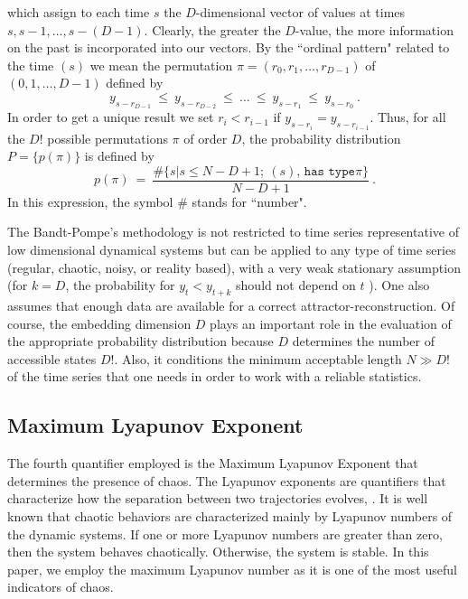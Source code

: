 which assign to each time $s$ the $D$-dimensional vector of values
at times $s, s-1,\dots,s-(D-1)$. Clearly, the greater the
$D$-value, the more information on the past  is incorporated into
our vectors. By the ``ordinal pattern" related to the time $(s)$
we mean the permutation $\pi=(r_0,r_1, \dots,r_{D-1})$ of
$(0,1,\dots,D-1)$ defined by
\begin{equation}
y_{s-r_{D-1}}~\le~y_{s-r_{D-2}}~\le~\dots~\le~y_{s-r_{1}}~\le~y_{s-r_0}
\ . \label{eq:permuta}
\end{equation}
In order to get a unique result we set $r_i <r_{i-1}$ if
$y_{s-r_{i}}=y_{s-r_{i-1}}$. Thus, for all the $D!$ possible
permutations $\pi$ of order $D$, the probability distribution
$P=\{p(\pi)\}$ is defined by
\begin{equation}
p(\pi)~=~\frac{\# \{s|s\leq N-D+1;~ (s) \texttt{, has type
}\pi\}}{N-D+1} \ . \label{eq:frequ}
\end{equation}
In this expression, the symbol $\#$ stands for ``number".

The Bandt-Pompe's methodology is not restricted to time series
representative of low dimensional dynamical systems but can be
applied to any type of time series (regular, chaotic, noisy, or
reality based), with a very weak stationary assumption (for $k =
D$, the probability for $y_t < y_{t+k}$ should not depend on $t$
\cite{Pompe2002}). One also assumes that enough data are available for
a correct attractor-reconstruction. Of course, the embedding
dimension $D$ plays an important role in the evaluation of the
appropriate probability distribution because $D$ determines the
number of accessible states $D!$. Also, it conditions the minimum
acceptable length $N \gg D!$ of the time series that one needs in
order to work with a reliable statistics.


\subsection{Maximum Lyapunov Exponent}

The fourth quantifier employed is the Maximum Lyapunov Exponent that determines the presence of chaos.
The Lyapunov exponents are quantifiers that characterize how the
separation between two trajectories evolves, \cite{Sprott2003}. It
is well known that chaotic behaviors are characterized
mainly by Lyapunov numbers of the dynamic systems. If one or more
Lyapunov numbers are greater than zero, then the system behaves
chaotically. Otherwise, the system is stable. In this paper, we
employ the maximum Lyapunov number as it is one of the most useful
indicators of chaos.

